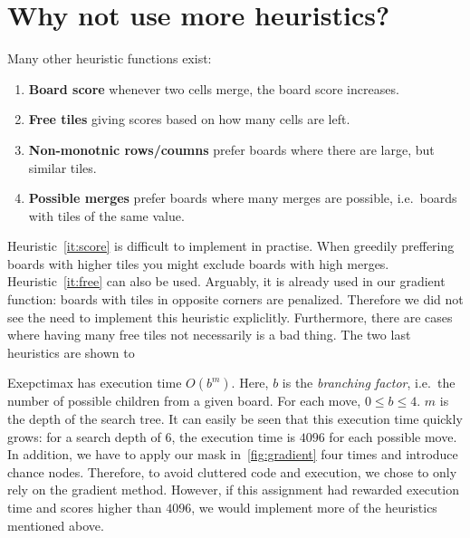 \documentclass[journal]{IEEEtran}
\begin{document}
\section*{Why not use more heuristics?}

Many other heuristic functions exist:
\begin{enumerate}
    \item\label{it:score} \textbf{Board score} \textendash{} whenever two cells merge, the board score increases.
    \item\label{it:free} \textbf{Free tiles} \textendash{} giving scores based on how many cells are left.
    \item\label{it:nonmono} \textbf{Non-monotnic rows/coumns} \textendash{} prefer boards where there are large, but similar
        tiles.
    \item\label{it:merges} \textbf{Possible merges} \textendash{} prefer boards where many merges are possible,
        i.e.\ boards with tiles of the same value.
\end{enumerate}

Heuristic~\ref{it:score} is difficult to implement in practise. When greedily preffering
boards with higher tiles you might exclude boards with high merges.
Heuristic~\ref{it:free} can also be used. Arguably, it is already used in our gradient
function: boards with tiles in opposite corners are penalized. Therefore we did
not see the need to implement this heuristic expliclitly. Furthermore, there are
cases where having many free tiles not necessarily is a bad thing.
The two last heuristics are shown to 

Exepctimax has execution time $O(b^{m})$. Here, $b$ is the \textit{branching factor},
i.e.\ the number of possible children from a given board. For each move, $0 \leq b \leq 4$.
$m$ is the depth of the search tree.  It can easily be seen that this execution time
quickly grows: for a search depth of 6, the execution time is $4096$ for each possible 
move. In addition, we have to apply our mask in~\autoref{fig:gradient} four times 
and introduce chance nodes. Therefore, to avoid cluttered code and
execution, we chose to only rely on the gradient method. However, if this assignment
had rewarded execution time and scores higher than $4096$, we would implement
more of the heuristics mentioned above. 




\end{document}
